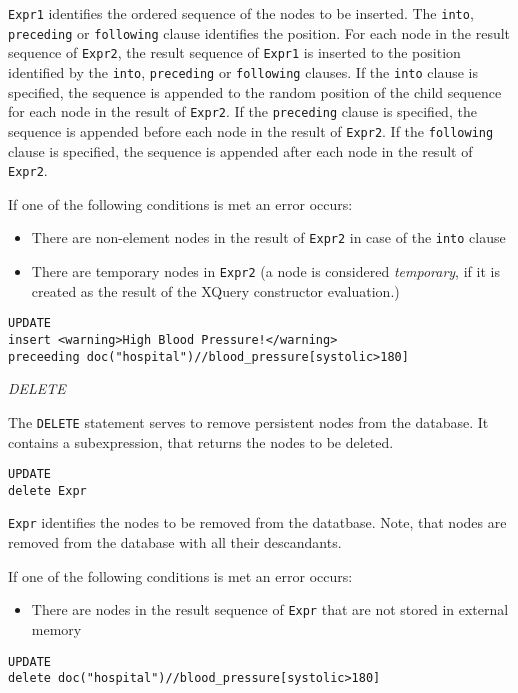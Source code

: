 \documentclass[a4paper,12pt]{article}
\begin{document}
\verb!Expr1! identifies the ordered sequence of the nodes to be inserted. The \verb!into!, \verb!preceding! or \verb!following! clause identifies the position. For each node in the result sequence of \verb!Expr2!, the result sequence of \verb!Expr1! is inserted to the position identified by the \verb!into!, \verb!preceding! or \verb!following! clauses.
If the \verb!into! clause is specified, the sequence is appended to the random position of the child sequence for each node in the result of \verb!Expr2!. If the \verb!preceding! clause is specified, the sequence is appended before each node in the result of \verb!Expr2!. If the \verb!following! clause is specified, the sequence is appended after each node in the result of \verb!Expr2!.

If one of the following conditions is met an error occurs:
\begin{itemize}
\item There are non-element nodes in the result of \verb!Expr2! in case of the \verb!into! clause
\item There are temporary nodes in  \verb!Expr2! (a node is considered \emph{temporary}, if it is created as the result of the XQuery constructor evaluation.)
\end{itemize}

\begin{verbatim}
UPDATE
insert <warning>High Blood Pressure!</warning>
preceeding doc("hospital")//blood_pressure[systolic>180]
\end{verbatim}

\emph{DELETE}

The \verb!DELETE! statement serves to remove persistent nodes from the database. It contains a subexpression, that returns the nodes to be deleted.

\begin{verbatim}
UPDATE
delete Expr
\end{verbatim}
\verb!Expr! identifies the  nodes to be removed from the datatbase. Note, that nodes are removed from the database with all their descandants.

If one of the following conditions is met an error occurs:
\begin{itemize}
\item There are nodes in the result sequence of \verb!Expr! that are not stored in external memory
\end{itemize}

\begin{verbatim}
UPDATE
delete doc("hospital")//blood_pressure[systolic>180]
\end{verbatim}
\end{document}
